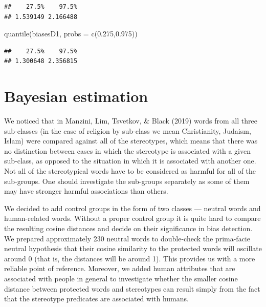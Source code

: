 \documentclass[
  10pt,
  dvipsnames,enabledeprecatedfontcommands]{scrartcl}
\newenvironment{Shaded}{\begin{snugshade}}{\end{snugshade}}
\newcommand{\AttributeTok}[1]{\textcolor[rgb]{0.77,0.63,0.00}{#1}}
\newcommand{\FloatTok}[1]{\textcolor[rgb]{0.00,0.00,0.81}{#1}}
\newcommand{\FunctionTok}[1]{\textcolor[rgb]{0.00,0.00,0.00}{#1}}
\newcommand{\NormalTok}[1]{#1}
\begin{document}
\begin{verbatim}
##    27.5%    97.5% 
## 1.539149 2.166488
\end{verbatim}

\begin{Shaded}
\begin{Highlighting}[]
\FunctionTok{quantile}\NormalTok{(biasesD1, }\AttributeTok{probs =} \FunctionTok{c}\NormalTok{(}\FloatTok{0.275}\NormalTok{,}\FloatTok{0.975}\NormalTok{))}
\end{Highlighting}
\end{Shaded}

\begin{verbatim}
##    27.5%    97.5% 
## 1.300648 2.356815
\end{verbatim}

\normalsize

\hypertarget{bayesian-estimation}{%
\section{Bayesian estimation}\label{bayesian-estimation}}

We noticed that in Manzini, Lim, Tsvetkov, \& Black (2019) words from
all three sub-classes (in the case of religion by sub-class we mean
Christianity, Judaism, Islam) were compared against all of the
stereotypes, which means that there was no distinction between cases in
which the stereotype is associated with a given sub-class, as opposed to
the situation in which it is associated with another one. Not all of the
stereotypical words have to be considered as harmful for all of the
sub-groups. One should investigate the sub-groups separately as some of
them may have stronger harmful associations than others.

We decided to add control groups in the form of two classes --- neutral
words and human-related words. Without a proper control group it is
quite hard to compare the resulting cosine distances and decide on their
significance in bias detection. We prepared approximately 230 neutral
words to double-check the prima-facie neutral hypothesis that their
cosine similarity to the protected words will oscillate around 0 (that
is, the distances will be around 1). This provides us with a more
reliable point of reference. Moreover, we added human attributes that
are associated with people in general to investigate whether the smaller
cosine distance between protected words and stereotypes can result
simply from the fact that the stereotype predicates are associated with
humans.
\end{document}

